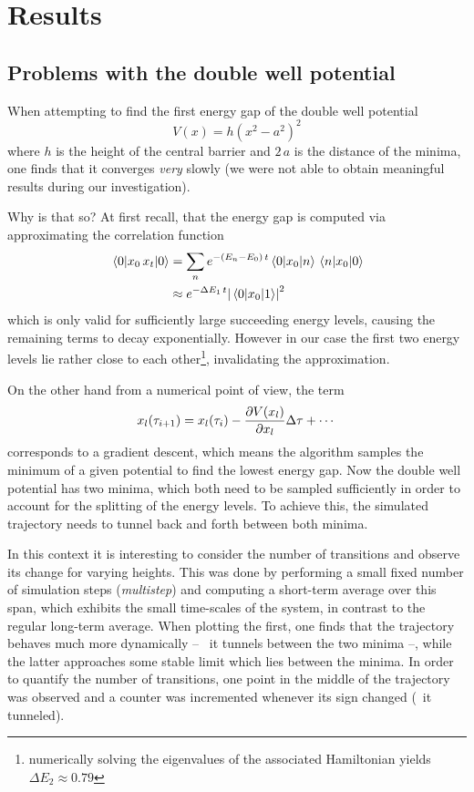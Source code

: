 \section{Results}
\subsection{Problems with the double well potential}
When attempting to find the first energy gap of the double well potential
\begin{equation}
    V(x)=h\left(x^2-a^2\right)^2
    \label{eq:double-well}
\end{equation}
where $h$ is the height of the central barrier and $2\,a$ is the distance of the
minima, one finds that it converges \emph{very} slowly (we were not able to
obtain meaningful results during our investigation).

Why is that so? At first recall, that the energy gap is computed via
approximating the correlation function
\begin{align*}
    \ev{x_0\,x_t}{0}&=\sum_{n}e^{-(E_n-E_0)\,t}\mel{0}{x_0}{n}\mel{n}{x_0}{0}
    \\&\approx{e^{-\Delta{E_1}\,t}}\abs{\mel{0}{x_0}{1}}^2
\end{align*}
which is only valid for sufficiently large succeeding energy levels, causing
the remaining terms to decay exponentially. However in our case the first two
energy levels lie rather close to each other\footnote{numerically solving the
eigenvalues of the associated Hamiltonian yields $\Delta{E_2}\approx0.79$},
invalidating the approximation.

On the other hand from a numerical point of view, the term
\begin{equation*}
    x_l(\tau_{i+1})=x_l(\tau_i)-\pdv{V(x_l)}{x_l}\Delta\tau+\dotsb
\end{equation*}
corresponds to a gradient descent, which means the algorithm samples the
minimum of a given potential to find the lowest energy gap. Now the double well
potential has two minima, which both need to be sampled sufficiently in order
to account for the splitting of the energy levels. To achieve this, the
simulated trajectory needs to tunnel back and forth between both minima.

In this context it is interesting to consider the number of transitions and
observe its change for varying heights. This was done by performing a small
fixed number of simulation steps (\emph{multistep}) and computing a short-term
average over this span, which exhibits the small time-scales of the system, in
contrast to the regular long-term average. When plotting the first, one finds
that the trajectory behaves much more dynamically -- \eg~it tunnels between the
two minima --, while the latter approaches some stable limit which lies between
the minima. In order to quantify the number of transitions, one point in the
middle of the trajectory was observed and a counter was incremented whenever
its sign changed (\ie~it tunneled).

